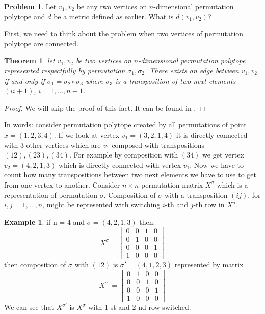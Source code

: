 \documentclass[11pt]{article}
\theoremstyle{plain}
\newtheorem{theorem}[thm]{Theorem}
\theoremstyle{definition}
\newtheorem{example}[thm]{Example}
\newtheorem{problem}[thm]{Problem}
\begin{document}
\begin{problem}
    Let $v_1,v_2$ be any two vertices on $n$-dimensional permutation polytope and $d$ be a metric defined as earlier. What is $d(v_1,v_2)$?
\end{problem}
First, we need to think about the problem when two vertices of permutation polytope are connected.
\begin{theorem}
    let $v_1,v_2$ be two vertices on $n$-dimensional permutation polytope represented respectfully by permutation $\sigma_1, \sigma_2$. There exists an edge between $v_1,v_2$ if and only if  $\sigma_1 = \sigma_2 \circ \sigma_3$ where $\sigma_3$ is a transposition of two next elements $(i i+1)$, $i = 1,...,n-1$. 
\end{theorem}
\begin{proof}
    We will skip the proof of this fact. It can be found in \cite{Permutahedron MIMUW}.
\end{proof}
In words: consider permutation polytope created by all permutations of point $x = (1,2,3,4)$. If we look at vertex $v_1 = (3,2,1,4)$ it is directly connected with 3 other vertices which are $v_1$ composed with transpositions $(1 2), (2 3), (3 4) $. For example by composition with $(3 4)$ we get vertex $v_2 = (4,2,1,3)$ which is directly connected with vertex $v_1$.
Now we have to count how many transpositions between two next elements we have to use to get from one vertex to another. 
Consider $n \times n$ permutation matrix $X^\sigma$ which is a representation of permutation $\sigma$. Composition of $\sigma$ with a transposition $(i j)$, for $i,j =1,...,n$, might be represented with switching $i$-th and $j$-th row in $X^\sigma$.
\begin{example}
    if n = 4 and $\sigma =(4,2,1,3)$ then:
    $$X^\sigma = \begin{bmatrix}
    0 & 0 & 1 & 0 \\ 0 & 1 & 0 & 0 \\ 0 & 0 & 0 & 1 \\ 1 & 0 & 0 & 0\end{bmatrix}$$
    then composition of $\sigma$ with $(1 2)$ is $\sigma' = (4,1,2,3)$ represented by matrix $$ X^{\sigma'} = \begin{bmatrix}
        0&1&0&0\\0&0&1&0\\0&0&0&1\\1&0&0&0
    \end{bmatrix}$$
    We can see that $X^{\sigma'}$ is $X^\sigma$ with 1-st and 2-nd row switched.
\end{example}
\end{document}
